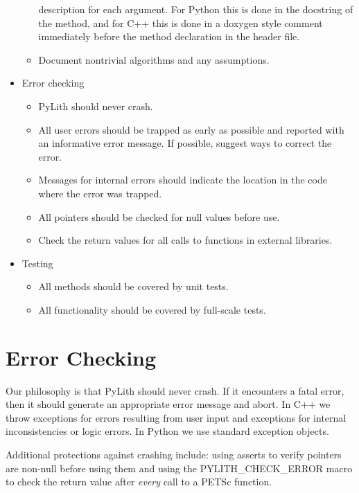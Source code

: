 \begin{itemize}
\begin{itemize}
      description for each argument. For Python this is done in the
      docstring of the method, and for C++ this is done in a doxygen
      style comment immediately before the method declaration in the
      header file.
    \item Document nontrivial algorithms and any assumptions.
    \end{itemize}
  \item Error checking
    \begin{itemize}
    \item PyLith should never crash.
    \item All user errors should be trapped as early as possible and
      reported with an informative error message. If possible, suggest
      ways to correct the error.
    \item Messages for internal errors should indicate the location in
      the code where the error was trapped.
    \item All pointers should be checked for null values before use.
    \item Check the return values for all calls to functions in external
      libraries.
    \end{itemize}
  \item Testing
    \begin{itemize}
    \item All methods should be covered by unit tests.
    \item All functionality should be covered by full-scale tests.
    \end{itemize}
\end{itemize}

\section{Error Checking}

Our philosophy is that PyLith should never crash. If it encounters a
fatal error, then it should generate an appropriate error message and
abort. In C++ we throw  exceptions for
errors resulting from user input and 
exceptions for internal inconsistencies or logic errors. In Python we
use standard exception objects.

Additional protections against crashing include: using asserts to
verify pointers are non-null before using them and using the
PYLITH\_CHECK\_ERROR macro to check the return value after {\em every}
call to a PETSc function.

